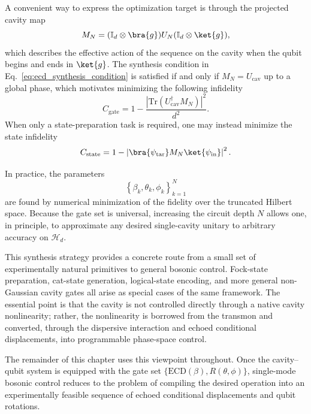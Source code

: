A convenient way to express the optimization target is through the projected cavity map
\begin{equation}
    M_N
    =
    (\mathbb{I}_d\otimes\bra{g})
    U_N
    (\mathbb{I}_d\otimes\ket{g}),
\end{equation}
which describes the effective action of the sequence on the cavity when the qubit begins and ends in \(\ket{g}\). The synthesis condition in Eq.~\eqref{eq:ecd_synthesis_condition} is satisfied if and only if $M_N = U_{\text{cav}}$ up to a global phase, which motivates minimizing the following infidelity
\begin{equation}
    C_{\mathrm{gate}}
    =
    1
    -
    \frac{
        \left|
            \mathrm{Tr}
            \left(
                U_{\mathrm{cav}}^\dagger M_N
            \right)
        \right|^2
    }{d^2}.
    \label{eq:projected_gate_infidelity}
\end{equation}
When only a state-preparation task is required, one may instead minimize the state infidelity
\begin{equation}
    C_{\mathrm{state}}
    =
    1
    -
    \left|
        \bra{\psi_{\mathrm{tar}}}
        M_N
        \ket{\psi_{\mathrm{in}}}
    \right|^2.
\end{equation}

In practice, the parameters
\begin{equation}
    \left\{
        \beta_k,\theta_k,\phi_k
    \right\}_{k=1}^N
\end{equation}
are found by numerical minimization of the fidelity over the truncated Hilbert space. Because the gate set is universal, increasing the circuit depth \(N\) allows one, in principle, to approximate any desired single-cavity unitary to arbitrary accuracy on \(\mathcal{H}_d\).

This synthesis strategy provides a concrete route from a small set of experimentally natural primitives to general bosonic control. Fock-state preparation, cat-state generation, logical-state encoding, and more general non-Gaussian cavity gates all arise as special cases of the same framework. The essential point is that the cavity is not controlled directly through a native cavity nonlinearity; rather, the nonlinearity is borrowed from the transmon and converted, through the dispersive interaction and echoed conditional displacements, into programmable phase-space control.

The remainder of this chapter uses this viewpoint throughout. Once the cavity--qubit system is equipped with the gate set \(\{\mathrm{ECD}(\beta),R(\theta,\phi)\}\), single-mode bosonic control reduces to the problem of compiling the desired operation into an experimentally feasible sequence of echoed conditional displacements and qubit rotations.


